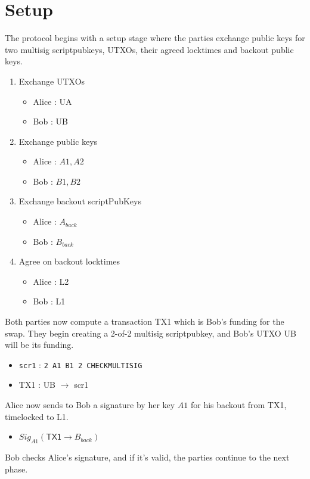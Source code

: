 \documentclass[12pt,a4paper]{article}
\begin{document}
\section{Setup}
The protocol begins with a setup stage where the parties exchange public keys for two multisig scriptpubkeys, UTXOs, their agreed locktimes and backout public keys.
\begin{footnotesize}
\begin{enumerate}
\item Exchange UTXOs
	\begin{itemize}
	\item Alice : \textsf{UA}
	\item Bob   : \textsf{UB}
	\end{itemize}
\item Exchange public keys
	\begin{itemize}
	\item Alice : $A1, A2$
	\item Bob   : $B1, B2$
	\end{itemize}
\item Exchange backout scriptPubKeys
	\begin{itemize}
	\item Alice : $A_{back}$
	\item Bob   : $B_{back}$
	\end{itemize}
\item Agree on backout locktimes
	\begin{itemize}
	\item Alice : \textsf{L2}
	\item Bob   : \textsf{L1}
	\end{itemize}
\end{enumerate}
\end{footnotesize}
Both parties now compute a transaction \textsf{TX1} which is Bob's funding for the swap.  They begin creating a 2-of-2 multisig scriptpubkey, and Bob's UTXO \textsf{UB} will be its funding.
\begin{footnotesize}
\begin{itemize}
\item \texttt{scr1} : \texttt{2 A1 B1 2 CHECKMULTISIG}
\item \textsf{TX1} : \textsf{UB} $\rightarrow$ \textsf{scr1}
\end{itemize}
\end{footnotesize}
Alice now sends to Bob a signature by her key $A1$ for his backout from \textsf{TX1}, timelocked to \textsf{L1}.
\begin{footnotesize}
\begin{itemize}
\item $Sig_{A1}(\textsf{TX1} \rightarrow B_{back})$
\end{itemize}
\end{footnotesize}
Bob checks Alice's signature, and if it's valid, the parties continue to the next phase.
\newpage
\end{document}

